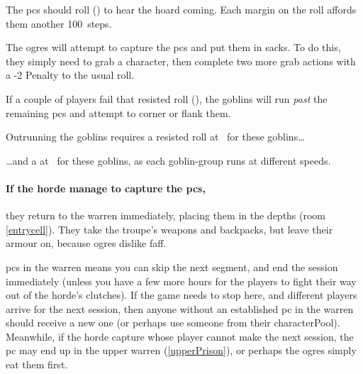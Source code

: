 The \glspl{pc} should roll  (\tn[5]) to hear the hoard coming.
Each margin on the roll affords them another 100~\glspl{step}.



The \glspl{ogre} will attempt to capture the \glspl{pc} and put them in sacks.
To do this, they simply need to grab a character,%
then complete two more grab actions with a -2 Penalty to the usual roll.

If a couple of players fail that resisted  roll (\tn), the goblins will run \emph{past} the remaining \glspl{pc} and attempt to corner or flank them.%


Outrunning the goblins requires a resisted  roll at \tn\ for these goblins\ldots


\ldots and a  at \tn\ for these goblins, as each goblin-group runs at different speeds.


\paragraph{If the horde manage to capture the \glspl{pc},}
they return to the \gls{warren} immediately, placing them in the depths (room \vref{entrycell}).
They take the troupe's weapons and backpacks, but leave their armour on, because \glspl{ogre} dislike faff.

\Glspl{pc} in the \gls{warren} means you can skip the next \gls{segment}, and end the session immediately (unless you have a few more hours for the players to fight their way out of the horde's clutches).
If the game needs to stop here, and different players arrive for the next session, then anyone without an established \gls{pc} in the \gls{warren} should receive a new one (or perhaps use someone from their \gls{characterPool}).
Meanwhile, if the horde capture  whose player cannot make the next session, the \gls{pc} may end up in the upper warren (\vref{upperPrison}), or perhaps the \glspl{ogre} simply eat them first.

